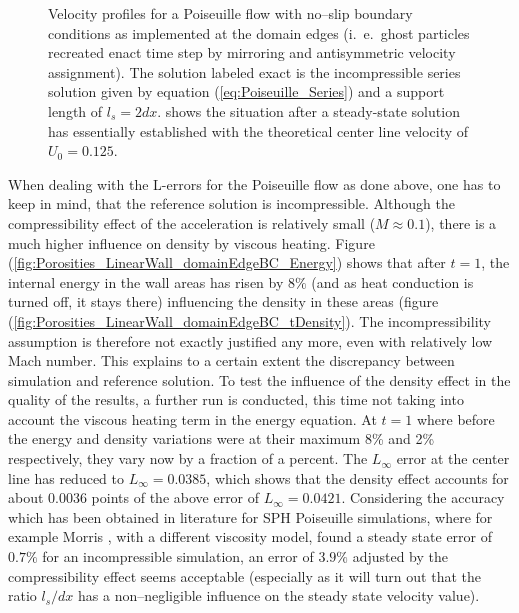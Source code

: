 \documentclass[11pt,a4paper,twoside]{report}
\begin{document}
\begin{figure}[!htbp]
\caption[Velocity profiles Poiseuille flow]{Velocity profiles for a Poiseuille flow with no--slip boundary conditions as implemented at the domain edges (i.\ e.\ ghost particles recreated enact time step by mirroring and antisymmetric velocity assignment). The solution labeled exact is the incompressible series solution given by equation (\ref{eq:Poiseuille_Series}) and a support length of $l_s=2dx$.   shows the situation after a steady-state solution has essentially established with the theoretical center line velocity of $U_0=0.125$.}

\end{figure}

When dealing with the L-errors for the Poiseuille flow as done above, one has to keep in mind, that the reference solution is incompressible. Although the compressibility effect of the acceleration is relatively small ($M\approx0.1$), there is a much higher influence on density by viscous heating. Figure (\ref{fig:Porosities_LinearWall_domainEdgeBC_Energy}) shows that after $t=1$, the internal energy in the wall areas has risen by $8\%$ (and as heat conduction is turned off, it stays there) influencing the density in these areas (figure (\ref{fig:Porosities_LinearWall_domainEdgeBC_tDensity}). The incompressibility assumption is therefore not exactly justified any more, even with relatively low Mach number. This explains to a certain extent the discrepancy between simulation and reference solution. To test the influence of the density effect in the quality of the results, a further run is conducted, this time not taking into account the viscous heating term in the energy equation. At $t=1$ where before the energy and density variations were at their maximum 8\% and 2\% respectively, they vary now by a fraction of a percent. The $L_\infty$ error at the center line has reduced to $L_\infty=0.0385$, which shows that the density effect accounts for about 0.0036 points of the above error of $L_\infty=0.0421$. Considering the accuracy which has been obtained in literature for SPH Poiseuille simulations, where for example Morris \cite{Morris1997}, with a different viscosity model, found a steady state error of $0.7\%$ for an incompressible simulation, an error of $3.9\%$ adjusted by the compressibility effect seems acceptable (especially as it will turn out that the ratio $l_s/dx$ has a non--negligible influence on the steady state velocity value).
\end{document}

